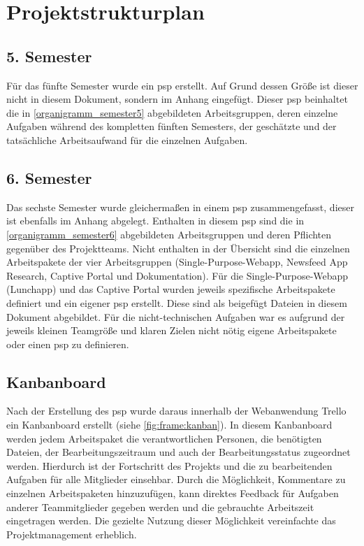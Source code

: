 \section{Projektstrukturplan}

\subsection{5. Semester}

Für das fünfte Semester wurde ein \gls{psp} erstellt. Auf Grund dessen Größe ist dieser nicht in diesem Dokument, sondern im Anhang eingefügt. Dieser \gls{psp} beinhaltet die in \vref{organigramm_semester5} abgebildeten Arbeitsgruppen, deren einzelne Aufgaben während des kompletten fünften Semesters, der geschätzte und der tatsächliche Arbeitsaufwand für die einzelnen Aufgaben.

\subsection{6. Semester}

Das sechste Semester wurde gleichermaßen in einem \gls{psp} zusammengefasst, dieser ist ebenfalls im Anhang abgelegt. Enthalten in diesem \gls{psp} sind die in \vref{organigramm_semester6} abgebildeten Arbeitsgruppen und deren Pflichten gegenüber des Projektteams. Nicht enthalten in der Übersicht sind die einzelnen Arbeitspakete der vier Arbeitsgruppen (Single-Purpose-Webapp, Newsfeed App Research, Captive Portal und Dokumentation). Für die Single-Purpose-Webapp (Lunchapp) und das Captive Portal wurden jeweils spezifische Arbeitspakete definiert und ein eigener \gls{psp} erstellt. Diese sind als beigefügt Dateien in diesem Dokument abgebildet. Für die nicht-technischen Aufgaben war es aufgrund der jeweils kleinen Teamgröße und klaren Zielen nicht nötig eigene Arbeitspakete oder einen \gls{psp} zu definieren. 

\subsection{Kanbanboard}

Nach der Erstellung des \gls{psp} wurde daraus innerhalb der Webanwendung Trello ein Kanbanboard erstellt (siehe \ref{fig:frame:kanban}). In diesem Kanbanboard werden jedem Arbeitspaket die verantwortlichen Personen, die benötigten Dateien, der Bearbeitungszeitraum und auch der Bearbeitungsstatus zugeordnet werden. Hierdurch ist der Fortschritt des Projekts und die zu bearbeitenden Aufgaben für alle Mitglieder einsehbar. Durch die Möglichkeit, Kommentare zu einzelnen Arbeitspaketen hinzuzufügen, kann direktes Feedback für Aufgaben anderer Teammitglieder gegeben werden und die gebrauchte Arbeitszeit eingetragen werden. Die gezielte Nutzung dieser Möglichkeit vereinfachte das Projektmanagement erheblich.

